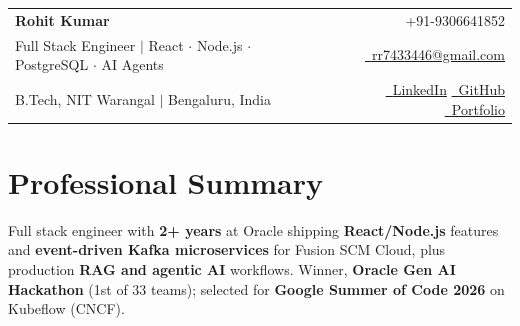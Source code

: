 \documentclass[a4paper,10pt]{article}
\makeatletter
\newcommand{\phone}{9306641852}
\newcommand{\emaila}{rr7433446@gmail.com}
\makeatother
\begin{document}
\selectfont

{
\begin{tabularx}{\linewidth}{L r} \\
  \textbf{\Large Rohit Kumar} & {\raisebox{0.0\height}{\footnotesize \faPhone}\ +91-\phone}\\
  {Full Stack Engineer $\vert$ React $\cdot$ Node.js $\cdot$ PostgreSQL $\cdot$ AI Agents} & \href{mailto:\emaila}{\raisebox{0.0\height}{\footnotesize \faEnvelope}\ {\emaila}} \\
  {B.Tech, NIT Warangal $\vert$ Bengaluru, India} & \href{https://www.linkedin.com/in/rr7433446/}{\raisebox{0.0\height}{\footnotesize \faLinkedin}\ {LinkedIn}}\enspace
  \href{https://github.com/kmr-rohit}{\raisebox{0.0\height}{\footnotesize \faGithub}\ {GitHub}}\enspace
  \href{https://kmrrohit.space/}{\raisebox{0.0\height}{\footnotesize \faGlobe}\ {Portfolio}}
\end{tabularx}
}

\section{\textbf{Professional Summary}}
\begin{itemize}[leftmargin=0.05in, label={}]
  \small{\item{
    Full stack engineer with \textbf{2+ years} at Oracle shipping \textbf{React/Node.js} features and \textbf{event-driven Kafka microservices} for Fusion SCM Cloud, plus production \textbf{RAG and agentic AI} workflows. Winner, \textbf{Oracle Gen AI Hackathon} (1st of 33 teams); selected for \textbf{Google Summer of Code 2026} on Kubeflow (CNCF).
  }}
\end{itemize}
\vspace{-8pt}

\end{document}
